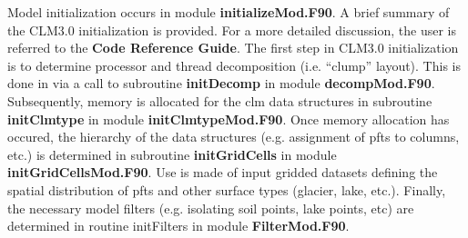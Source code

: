 Model initialization occurs in module {\bf initializeMod.F90}.  A
brief summary of the CLM3.0 initialization is provided. For a more
detailed discussion, the user is referred to the {\bf Code Reference
Guide}. The first step in CLM3.0 initialization is to determine
processor and thread decomposition (i.e. ``clump'' layout). This is
done in via a call to subroutine {\bf initDecomp} in module {\bf
decompMod.F90}. Subsequently, memory is allocated for the clm data
structures in subroutine {\bf initClmtype} in module {\bf
initClmtypeMod.F90}. Once memory allocation has occured, the hierarchy
of the data structures (e.g. assignment of pfts to columns, etc.) 
is determined in subroutine {\bf initGridCells} in module {\bf
initGridCellsMod.F90}. Use is made of input gridded datasets defining
the spatial distribution of pfts and other surface types (glacier,
lake, etc.). Finally, the necessary model filters (e.g. isolating soil
points, lake points, etc) are determined in routine initFilters in
module {\bf FilterMod.F90}.


